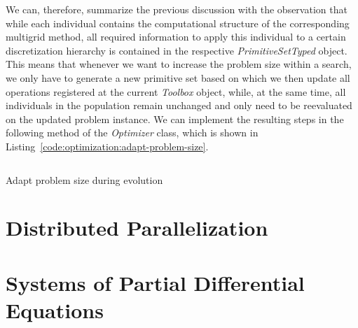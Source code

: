 We can, therefore, summarize the previous discussion with the observation that while each individual contains the computational structure of the corresponding multigrid method, all required information to apply this individual to a certain discretization hierarchy is contained in the respective \emph{PrimitiveSetTyped} object.
This means that whenever we want to increase the problem size within a search, we only have to generate a new primitive set based on which we then update all operations registered at the current \emph{Toolbox} object, while, at the same time, all individuals in the population remain unchanged and only need to be reevaluated on the updated problem instance.
We can implement the resulting steps in the following method of the \emph{Optimizer} class, which is shown in Listing~\ref{code:optimization:adapt-problem-size}.
\begin{listing}
	\inputminted[linenos]{python}{evostencils/optimization/adapt_problem_size.py}
	\caption{Adapt problem size during evolution}
	\label{code:optimization:adapt-problem-size}
\end{listing}
 
 
 




\section{Distributed Parallelization}
\section{Systems of Partial Differential Equations}